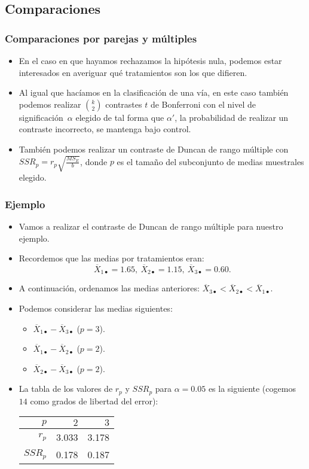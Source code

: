 \subsection{Comparaciones}
\begin{frame}
\frametitle{Comparaciones por parejas y múltiples}
\begin{itemize}
\item<2-> En el caso en que hayamos rechazamos la hipótesis nula, podemos estar interesados en averiguar qué tratamientos son los que difieren.
\item<3-> Al igual que hacíamos en la clasificación de una vía, en este caso también podemos realizar $\binom{k}{2}$ contrastes $t$ de Bonferroni con el nivel de significación~$\alpha$ elegido de tal forma que $\alpha'$, la probabilidad de realizar un contraste incorrecto, se mantenga bajo control.
\item<4-> También podemos realizar un contraste de Duncan de rango múltiple con $SSR_p =r_p \sqrt{\frac{MS_E}{b}}$, donde $p$ es el tamaño del subconjunto de medias muestrales elegido.
\end{itemize}
\end{frame}
\begin{frame}[fragile]
\frametitle{Ejemplo}
\begin{itemize}
\item<2-> Vamos a realizar el contraste de Duncan de rango múltiple para nuestro ejemplo.
\item<3-> Recordemos que las medias por tratamientos eran:
\[
\overline{X}_{1\bullet} =1.65,\ \overline{X}_{2\bullet}=1.15,\ \overline{X}_{3\bullet}=0.60.
\]
\item<4-> A continuación, ordenamos las medias anteriores: $\overline{X}_{3\bullet} < \overline{X}_{2\bullet} < \overline{X}_{1\bullet}$.
\item<5-> Podemos considerar las medias siguientes:
\begin{itemize}
\item<6-> $\overline{X}_{1\bullet} - \overline{X}_{3\bullet}$ ($p=3$).
\item<7-> $\overline{X}_{1\bullet} - \overline{X}_{2\bullet}$ ($p=2$).
\item<8-> $\overline{X}_{2\bullet} - \overline{X}_{3\bullet}$ ($p=2$).
\end{itemize}
\item<9-> La tabla de los valores de $r_p$ y $SSR_p$ para $\alpha =0.05$ es la siguiente (cogemos $14$ como grados de libertad del error):
\begin{center}
\begin{tabular}{|r|r|r|}
\hline
$p$&$2$&$3$\\\hline
$r_p$&3.033&3.178\\\hline
$SSR_p$&0.178&0.187\\\hline
\end{tabular}
\end{center}
\end{itemize}
\end{frame}
